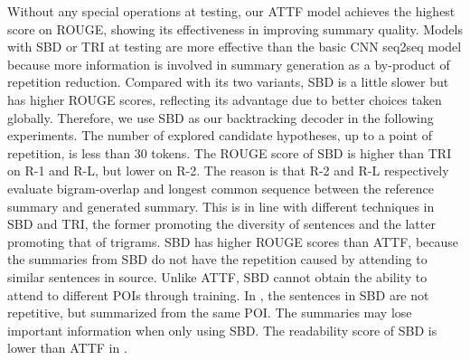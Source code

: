 Without any special operations at testing, 
our ATTF model achieves the highest score on ROUGE, showing
its effectiveness in improving summary quality.
Models with SBD or TRI at testing
are more effective than the basic CNN seq2seq model
because more information is involved in summary generation 
as a by-product of repetition reduction.
Compared with its two variants, SBD is a little slower 
but has higher ROUGE scores, reflecting its advantage due to
better choices taken globally.
Therefore, 
we use SBD as our backtracking decoder in the following experiments. 
The number of explored candidate hypotheses, up to a point of
repetition, is less than 30 tokens.
The ROUGE score of SBD is higher than TRI on R-1 and R-L, but lower on R-2. 
The reason is that R-2 and R-L respectively evaluate
bigram-overlap and longest common sequence between the reference
summary and generated summary. This is in line with different techniques 
in SBD and TRI, the former promoting the diversity of sentences and 
the latter promoting that of trigrams.
SBD has higher ROUGE scores than ATTF,
because the summaries from
SBD do not have the repetition caused by attending to similar sentences in source.
Unlike ATTF, 
SBD cannot obtain the ability to attend to different POIs through training.
In , the sentences in SBD are not repetitive, 
but summarized from the same POI.
The summaries may lose important information when only using SBD.
The readability score of SBD is lower than ATTF in .

